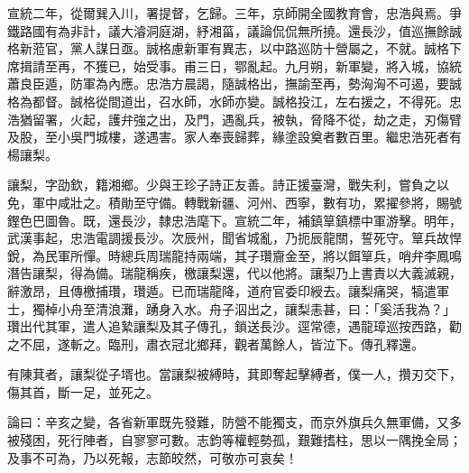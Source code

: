\begin{pinyinscope}
宣統二年，從爾巽入川，署提督，乞歸。三年，京師開全國教育會，忠浩與焉。爭鐵路國有為非計，議大濬洞庭湖，紓湘菑，議論侃侃無所撓。還長沙，值巡撫餘誠格新蒞官，黨人謀日亟。誠格慮新軍有異志，以中路巡防十營屬之，不就。誠格下席揖請至再，不獲已，始受事。甫三日，鄂亂起。九月朔，新軍變，將入城，協統蕭良臣遁，防軍為內應。忠浩方晨謁，隨誠格出，撫諭至再，勢洶洶不可遏，要誠格為都督。誠格從間道出，召水師，水師亦變。誠格投江，左右援之，不得死。忠浩猶留署，火起，護弁強之出，及門，遇亂兵，被執，脅降不從，劫之走，刃傷臂及股，至小吳門城樓，遂遇害。家人奉喪歸葬，緣塗設奠者數百里。繼忠浩死者有楊讓梨。

讓梨，字劭欽，籍湘鄉。少與王珍子詩正友善。詩正援臺灣，戰失利，嘗負之以免，軍中咸壯之。積勛至守備。轉戰新疆、河州、西寧，數有功，累擢參將，賜號鏗色巴圖魯。既，還長沙，隸忠浩麾下。宣統二年，補鎮筸鎮標中軍游擊。明年，武漢事起，忠浩電調援長沙。次辰州，聞省城亂，乃扼辰龍關，誓死守。筸兵故悍銳，為民軍所憚。時總兵周瑞龍持兩端，其子瓚齎金至，將以餌筸兵，哨弁李鳳鳴潛告讓梨，得為備。瑞龍稱疾，檄讓梨還，代以他將。讓梨乃上書責以大義滅親，辭激昂，且傳檄捕瓚，瓚遁。已而瑞龍降，道府官委印綬去。讓梨痛哭，犒遣軍士，獨棹小舟至清浪灘，踴身入水。舟子泅出之，讓梨恚甚，曰：「奚活我為？」瓚出代其軍，遣人追縶讓梨及其子傳孔，鎖送長沙。逕常德，遇龍璋巡按西路，勸之不屈，遂斬之。臨刑，肅衣冠北鄉拜，觀者萬餘人，皆泣下。傳孔釋還。

有陳萁者，讓梨從子壻也。當讓梨被縛時，萁即奪起擊縛者，僕一人，攢刃交下，傷其首，斷一足，並死之。

論曰：辛亥之變，各省新軍既先發難，防營不能獨支，而京外旗兵久無軍備，又多被殘困，死行陣者，自寥寥可數。志鈞等權輕勢孤，艱難搘柱，思以一隅挽全局；及事不可為，乃以死報，志節皎然，可敬亦可哀矣！


\end{pinyinscope}
